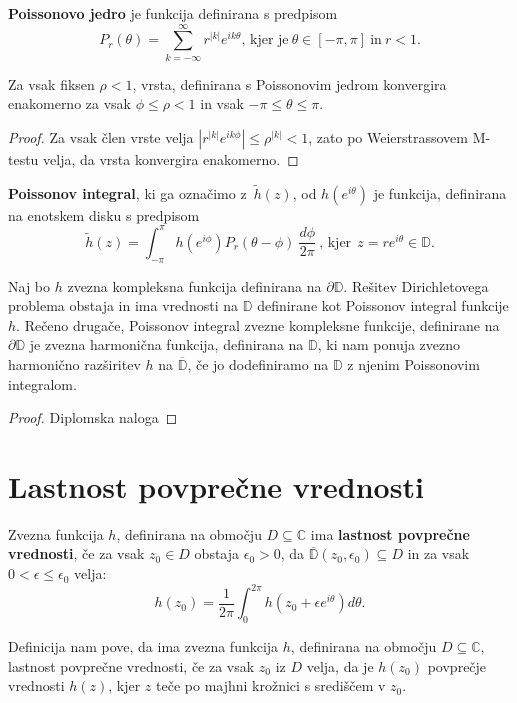 \documentclass[mat1]{fmfdelo}
\newcommand{\C}{\mathbb C}
\begin{document}
    \begin{definicija}
        \textbf{Poissonovo jedro} je funkcija definirana s predpisom
        $$
           P_r(\theta) = \sum_{k = -\infty}^{\infty}{r^{|k|} e^{i k \theta}}\text{, kjer je}~\theta \in [-\pi, \pi]~\text{in}~ r < 1.
        $$
    \end{definicija}
    \begin{trditev}
        Za vsak fiksen $\rho < 1$, vrsta, definirana s Poissonovim jedrom konvergira enakomerno za vsak $\phi \leq \rho < 1$ in vsak $ -\pi \leq \theta \leq \pi$.
    \end{trditev}
    \begin{proof}
        Za vsak člen vrste velja $|r^{|k|} e^{i k \phi}| \leq \rho^{|k|} < 1$, zato po Weierstrassovem M-testu velja, da vrsta konvergira enakomerno.
    \end{proof}

    \begin{definicija}
        \textbf{Poissonov integral}, ki ga označimo z~$\widetilde{h}(z)$, od $h(e^{i\theta})$ je funkcija, definirana na enotskem disku s predpisom
        $$
        \widetilde{h}(z) = \int_{-\pi}^{\pi}{h(e^{i\phi}) P_r(\theta - \phi)~\frac{d\phi}{2 \pi}}~\text{, kjer}~~z = r e^{i\theta} \in \mathbb{D}.
        $$
     \end{definicija}
     \begin{trditev}
        Naj bo $h$ zvezna kompleksna funkcija definirana na $\partial \mathbb{D}$. Rešitev Dirichletovega problema obstaja in ima vrednosti na $\mathbb{D}$ definirane kot Poissonov integral funkcije $h$.
        \newline
        Rečeno drugače, Poissonov integral zvezne kompleksne funkcije, definirane na $\partial \mathbb{D}$ je zvezna harmonična funkcija, definirana na $\mathbb{D}$, ki nam ponuja zvezno harmonično razširitev $h$ na $\overline{\mathbb{D}}$, če jo dodefiniramo na $\mathbb{D}$ z njenim Poissonovim integralom.
     \end{trditev}
     \begin{proof}
        Diplomska naloga
     \end{proof}

\section{Lastnost povprečne vrednosti}
     \begin{definicija}
        Zvezna funkcija $h$, definirana na območju $D \subseteq \C$ ima \textbf{lastnost povprečne vrednosti}, če za vsak $z_0 \in D$ obstaja $\epsilon_0 > 0$, da $\overline{\mathbb{D}}(z_0, \epsilon_0) \subseteq D$ in za vsak $0 < \epsilon \leq \epsilon_0 $ velja:
        $$
            h(z_0) = \frac{1}{2 \pi} \int_{0}^{2 \pi}{h(z_0 + \epsilon e^{i \theta}) d\theta}.
        $$
    \end{definicija}
    \begin{opomba}
        Definicija nam pove, da ima zvezna funkcija $h$, definirana na območju $D \subseteq \C$, lastnost povprečne vrednosti, če za vsak $z_0$ iz $D$ velja, 
        da je $h(z_0)$ povprečje vrednosti $h(z)$, kjer $z$ teče po majhni krožnici s središčem v $z_0$.
    \end{opomba}
\end{document}
